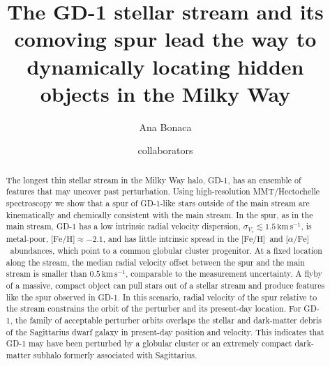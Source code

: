 \documentclass[twocolumn]{aastex63}
\newcommand{\kms}{\ensuremath{\textrm{km}\,\textrm{s}^{-1}}}
\newcommand{\feh}{\ensuremath{\textrm{[Fe/H]}}}
\newcommand{\afe}{\ensuremath{\textrm{[$\alpha$/Fe]}}}
\begin{document}
\sloppy\sloppypar\raggedbottom\frenchspacing %

\title{The GD-1 stellar stream and its comoving spur lead the way to dynamically locating hidden objects in the Milky Way}


\author[0000-0002-7846-9787]{Ana Bonaca}

\author{collaborators}


% 
% 

\begin{abstract}\noindent %
The longest thin stellar stream in the Milky Way halo, GD-1, has an ensemble of features that may uncover past perturbation.
Using high-resolution MMT/Hectochelle spectroscopy we show that a spur of GD-1-like stars outside of the main stream are kinematically and chemically consistent with the main stream.
In the spur, as in the main stream, GD-1 has a low intrinsic radial velocity dispersion, $\sigma_{V_r}\lesssim1.5\,\kms$, is metal-poor, $\feh\approx-2.1$, and has little intrinsic spread in the \feh\ and \afe\ abundances, which point to a common globular cluster progenitor.
At a fixed location along the stream, the median radial velocity offset between the spur and the main stream is smaller than $0.5\,\kms$, comparable to the measurement uncertainty.
A flyby of a massive, compact object can pull stars out of a stellar stream and produce features like the spur observed in GD-1.
In this scenario, radial velocity of the spur relative to the stream constrains the orbit of the perturber and its present-day location.
For GD-1, the family of acceptable perturber orbits overlaps the stellar and dark-matter debris of the Sagittarius dwarf galaxy in present-day position and velocity.
This indicates that GD-1 may have been perturbed by a globular cluster or an extremely compact dark-matter subhalo formerly associated with Sagittarius.
\end{abstract}
\end{document}

